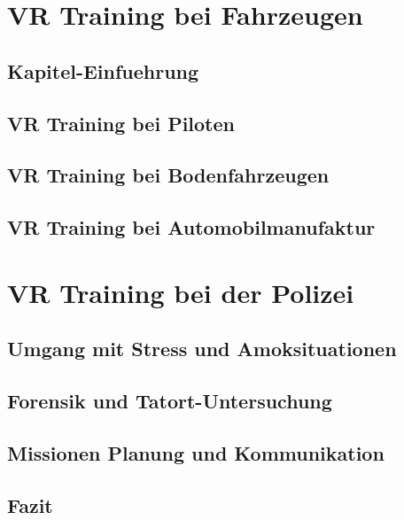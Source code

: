 \documentclass[
    12pt,
    a4paper,
    doubleside,
    BCOR=10mm,
    parskip=half,
    ngerman
]{scrbook}
\begin{document}
\chapter{VR Training bei Fahrzeugen}\label{sec:Fahrzeugen}

\section{Kapitel-Einfuehrung}\label{sec:Einfuehrung}

\section{VR Training bei Piloten}\label{sec:Piloten}

\section{VR Training bei Bodenfahrzeugen}\label{sec:Bodenfahrzeugen}

\section{VR Training bei Automobilmanufaktur}\label{sec:Automobilmanufaktur}

\chapter{VR Training bei der Polizei}\label{sec:polizei}

\section{Umgang mit Stress und Amoksituationen}\label{sec:polizei-SuA}

\section{Forensik und Tatort-Untersuchung}\label{sec:polizei-FuT}

\section{Missionen Planung und Kommunikation}\label{sec:polizei-PuK}

\section{Fazit}\label{sec:polizei-Fazit}

\end{document}
